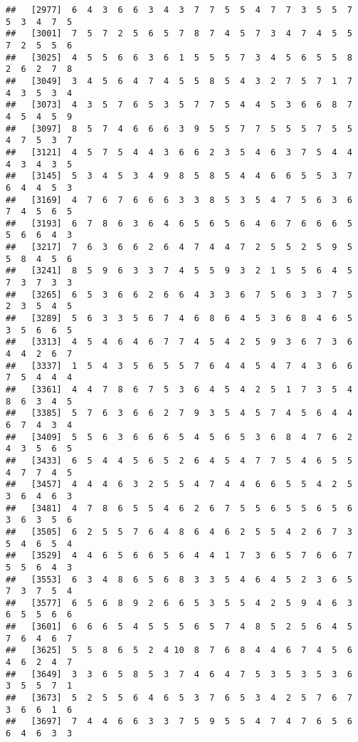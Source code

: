\documentclass[
]{book}
\begin{document}
\begin{verbatim}
##   [2977]  6  4  3  6  6  3  4  3  7  7  5  5  4  7  7  3  5  5  7  5  3  4  7  5
##   [3001]  7  5  7  2  5  6  5  7  8  7  4  5  7  3  4  7  4  5  5  7  2  5  5  6
##   [3025]  4  5  5  6  6  3  6  1  5  5  5  7  3  4  5  6  5  5  8  2  6  2  7  8
##   [3049]  3  4  5  6  4  7  4  5  5  8  5  4  3  2  7  5  7  1  7  4  3  5  3  4
##   [3073]  4  3  5  7  6  5  3  5  7  7  5  4  4  5  3  6  6  8  7  4  5  4  5  9
##   [3097]  8  5  7  4  6  6  6  3  9  5  5  7  7  5  5  5  7  5  5  4  7  5  3  7
##   [3121]  4  5  7  5  4  4  3  6  6  2  3  5  4  6  3  7  5  4  4  4  3  4  3  5
##   [3145]  5  3  4  5  3  4  9  8  5  8  5  4  4  6  6  5  5  3  7  6  4  4  5  3
##   [3169]  4  7  6  7  6  6  6  3  3  8  5  3  5  4  7  5  6  3  6  7  4  5  6  5
##   [3193]  6  7  8  6  3  6  4  6  5  6  5  6  4  6  7  6  6  6  5  5  6  6  4  3
##   [3217]  7  6  3  6  6  2  6  4  7  4  4  7  2  5  5  2  5  9  5  5  8  4  5  6
##   [3241]  8  5  9  6  3  3  7  4  5  5  9  3  2  1  5  5  6  4  5  7  3  7  3  3
##   [3265]  6  5  3  6  6  2  6  6  4  3  3  6  7  5  6  3  3  7  5  2  3  5  4  5
##   [3289]  5  6  3  3  5  6  7  4  6  8  6  4  5  3  6  8  4  6  5  3  5  6  6  5
##   [3313]  4  5  4  6  4  6  7  7  4  5  4  2  5  9  3  6  7  3  6  4  4  2  6  7
##   [3337]  1  5  4  3  5  6  5  5  7  6  4  4  5  4  7  4  3  6  6  7  5  4  4  4
##   [3361]  4  4  7  8  6  7  5  3  6  4  5  4  2  5  1  7  3  5  4  8  6  3  4  5
##   [3385]  5  7  6  3  6  6  2  7  9  3  5  4  5  7  4  5  6  4  4  6  7  4  3  4
##   [3409]  5  5  6  3  6  6  6  5  4  5  6  5  3  6  8  4  7  6  2  4  3  5  6  5
##   [3433]  6  5  4  4  5  6  5  2  6  4  5  4  7  7  5  4  6  5  5  4  7  7  4  5
##   [3457]  4  4  4  6  3  2  5  5  4  7  4  4  6  6  5  5  4  2  5  3  6  4  6  3
##   [3481]  4  7  8  6  5  5  4  6  2  6  7  5  5  6  5  5  6  5  6  3  6  3  5  6
##   [3505]  6  2  5  5  7  6  4  8  6  4  6  2  5  5  4  2  6  7  3  5  4  6  5  4
##   [3529]  4  4  6  5  6  6  5  6  4  4  1  7  3  6  5  7  6  6  7  5  5  6  4  3
##   [3553]  6  3  4  8  6  5  6  8  3  3  5  4  6  4  5  2  3  6  5  7  3  7  5  4
##   [3577]  6  5  6  8  9  2  6  6  5  3  5  5  4  2  5  9  4  6  3  6  5  5  6  6
##   [3601]  6  6  6  5  4  5  5  5  6  5  7  4  8  5  2  5  6  4  5  7  6  4  6  7
##   [3625]  5  5  8  6  5  2  4 10  8  7  6  8  4  4  6  7  4  5  6  4  6  2  4  7
##   [3649]  3  3  6  5  8  5  3  7  4  6  4  7  5  3  5  3  5  3  6  3  5  5  7  1
##   [3673]  5  2  5  5  6  4  6  5  3  7  6  5  3  4  2  5  7  6  7  3  6  6  1  6
##   [3697]  7  4  4  6  6  3  3  7  5  9  5  5  4  7  4  7  6  5  6  6  4  6  3  3

\end{verbatim}
\end{document}
